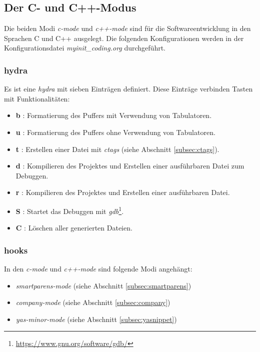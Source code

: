 \subsection{Der C- und C++-Modus}
\label{subsec:cc++moduskonf}
Die beiden Modi \textit{c-mode} und \textit{c++-mode} sind für die
Softwareentwicklung in den Sprachen C und C++ ausgelegt. Die folgenden
Konfigurationen werden in der Konfigurationsdatei
\textit{myinit\_coding.org} durchgeführt.\\

\subsubsection{hydra}
Es ist eine \textit{hydra} mit sieben Einträgen definiert. Diese
Einträge verbinden Tasten mit Funktionalitäten:
\begin{itemize}
\item \textbf{b} : Formatierung des Puffers mit Verwendung von
  Tabulatoren.
\item \textbf{u} : Formatierung des Puffers ohne Verwendung von
  Tabulatoren.
\item \textbf{t} : Erstellen einer Datei mit \textit{ctags} (siehe
  Abschnitt \ref{subsec:ctags}).
\item \textbf{d} : Kompilieren des Projektes und Erstellen einer
  ausführbaren Datei zum Debuggen.
\item \textbf{r} : Kompilieren des Projektes und Erstellen einer
  ausführbaren Datei.
\item \textbf{S} : Startet das Debuggen mit
  \textit{gdb}\footnote{\url{https://www.gnu.org/software/gdb/}}.
\item \textbf{C} : Löschen aller generierten Dateien.
\end{itemize}

\subsubsection{hooks}
In den \textit{c-mode} und \textit{c++-mode} sind folgende Modi
angehängt:
\begin{itemize}
\item \textit{smartparens-mode} (siehe Abschnitt
  \ref{subsec:smartparens})
\item \textit{company-mode} (siehe Abschnitt \ref{subsec:company})
\item \textit{yas-minor-mode} (siehe Abschnitt
  \ref{subsec:yasnippet})\\
\end{itemize}


